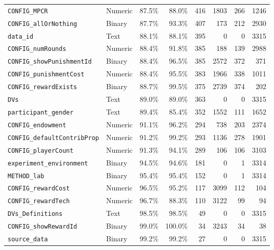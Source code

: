 \documentclass[11pt,a4paper]{article}
\begin{document}
\begin{center}
\begin{longtable}{llrrrrrr}
\rowcolor{green!18} \texttt{CONFIG\_MPCR} & Numeric & 87.5\% & 88.0\% & 416 & 1803 & 266 & 1246\\
\rowcolor{green!18} \texttt{CONFIG\_allOrNothing} & Binary & 87.7\% & 93.3\% & 407 & 173 & 212 & 2930\\
\rowcolor{green!18} \texttt{data\_id} & Text & 88.1\% & 88.1\% & 395 & 0 & 0 & 3315\\
\rowcolor{green!18} \texttt{CONFIG\_numRounds} & Numeric & 88.4\% & 91.8\% & 385 & 188 & 139 & 2988\\
\rowcolor{green!18} \texttt{CONFIG\_showPunishmentId} & Binary & 88.4\% & 96.5\% & 385 & 2572 & 372 & 371\\
\rowcolor{green!18} \texttt{CONFIG\_punishmentCost} & Numeric & 88.4\% & 95.5\% & 383 & 1966 & 338 & 1011\\
\rowcolor{green!18} \texttt{CONFIG\_rewardExists} & Binary & 88.7\% & 99.5\% & 375 & 2739 & 374 & 202\\
\rowcolor{green!18} \texttt{DVs} & Text & 89.0\% & 89.0\% & 363 & 0 & 0 & 3315\\
\rowcolor{green!18} \texttt{participant\_gender} & Text & 89.4\% & 85.4\% & 352 & 1552 & 111 & 1652\\
\rowcolor{green!18} \texttt{CONFIG\_endowment} & Numeric & 91.1\% & 96.2\% & 294 & 738 & 203 & 2374\\
\rowcolor{green!18} \texttt{CONFIG\_defaultContribProp} & Numeric & 91.2\% & 99.2\% & 293 & 1136 & 278 & 1901\\
\rowcolor{green!18} \texttt{CONFIG\_playerCount} & Numeric & 91.3\% & 94.1\% & 289 & 106 & 106 & 3103\\
\rowcolor{green!18} \texttt{experiment\_environment} & Binary & 94.5\% & 94.6\% & 181 & 0 & 1 & 3314\\
\rowcolor{green!18} \texttt{METHOD\_lab} & Binary & 95.4\% & 95.4\% & 152 & 0 & 1 & 3314\\
\rowcolor{green!18} \texttt{CONFIG\_rewardCost} & Numeric & 96.5\% & 95.2\% & 117 & 3099 & 112 & 104\\
\rowcolor{green!18} \texttt{CONFIG\_rewardTech} & Numeric & 96.7\% & 88.3\% & 110 & 3122 & 99 & 94\\
\rowcolor{green!18} \texttt{DVs\_Definitions} & Text & 98.5\% & 98.5\% & 49 & 0 & 0 & 3315\\
\rowcolor{green!18} \texttt{CONFIG\_showRewardId} & Binary & 99.0\% & 100.0\% & 34 & 3243 & 34 & 38\\
\rowcolor{green!18} \texttt{source\_data} & Binary & 99.2\% & 99.2\% & 27 & 0 & 0 & 3315\\

\end{longtable}
\end{center}
\end{document}
